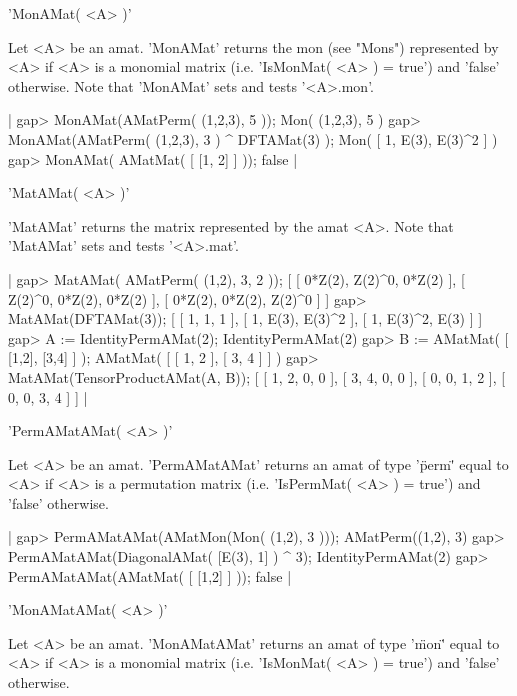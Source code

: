 
'MonAMat( <A> )'

Let <A> be an amat. 'MonAMat' returns the mon (see "Mons") represented 
by <A> if <A> is a monomial matrix (i.e. 'IsMonMat( <A> ) = true')
and 'false' otherwise. Note that 'MonAMat' sets and tests '<A>.mon'.

|    gap> MonAMat(AMatPerm( (1,2,3), 5 ));
    Mon( (1,2,3), 5 )
    gap> MonAMat(AMatPerm( (1,2,3), 3 ) ^ DFTAMat(3) );
    Mon( [ 1, E(3), E(3)^2 ] ) 
    gap> MonAMat( AMatMat( [ [1, 2] ] ));
    false |


'MatAMat( <A> )'

'MatAMat' returns the matrix represented by the amat <A>. 
Note that 'MatAMat' sets and tests '<A>.mat'.

|    gap> MatAMat( AMatPerm( (1,2), 3, 2 ));
    [ [ 0*Z(2), Z(2)^0, 0*Z(2) ], [ Z(2)^0, 0*Z(2), 0*Z(2) ], 
      [ 0*Z(2), 0*Z(2), Z(2)^0 ] ]
    gap> MatAMat(DFTAMat(3)); 
    [ [ 1, 1, 1 ], [ 1, E(3), E(3)^2 ], [ 1, E(3)^2, E(3) ] ]
    gap> A := IdentityPermAMat(2); 
    IdentityPermAMat(2)
    gap> B := AMatMat( [ [1,2], [3,4] ] );
    AMatMat(
      [ [ 1, 2 ], [ 3, 4 ] ]
    )
    gap> MatAMat(TensorProductAMat(A, B));
    [ [ 1, 2, 0, 0 ], [ 3, 4, 0, 0 ], [ 0, 0, 1, 2 ], [ 0, 0, 3, 4 ] ] |


'PermAMatAMat( <A> )'

Let <A> be an amat. 'PermAMatAMat' returns an amat of type '\"perm\"'
equal to <A> if <A> is a permutation matrix 
(i.e. 'IsPermMat( <A> ) = true') and 'false' otherwise. 

|    gap> PermAMatAMat(AMatMon(Mon( (1,2), 3 )));
    AMatPerm((1,2), 3)
    gap> PermAMatAMat(DiagonalAMat( [E(3), 1] ) ^ 3);
    IdentityPermAMat(2)
    gap> PermAMatAMat(AMatMat( [ [1,2] ] ));
    false |


'MonAMatAMat( <A> )'

Let <A> be an amat. 'MonAMatAMat' returns an amat of type '\"mon\"'
equal to <A> if <A> is a monomial matrix (i.e. 'IsMonMat( <A> ) = true')
and 'false' otherwise. 

